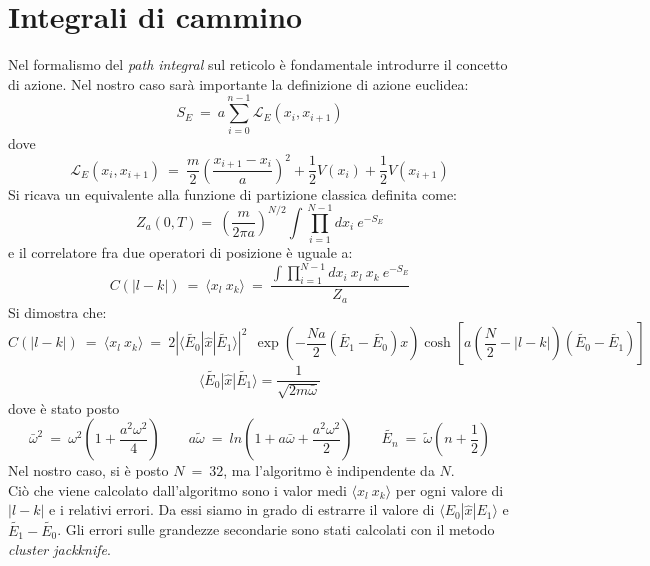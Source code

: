 \section{Integrali di cammino}
Nel formalismo del \emph{path integral} sul reticolo è fondamentale introdurre il concetto di azione.
Nel nostro caso sarà importante la definizione di azione euclidea:
$$
 S_E  \ = \ a \sum_{i=0}^{n-1} \mathcal{L}_E(x_i,x_{i+1})
$$
dove
$$
\mathcal{L}_E(x_i,x_{i+1}) \ = \ \frac{m}{2} \left( \frac{x_{i+1} -x_{i}}{a} \right)^2 + \frac{1}{2}V(x_i)  +\frac{1}{2}V(x_{i+1})
$$
 Si ricava un equivalente alla funzione di partizione classica definita come: 
$$
 Z_a (0,T) =  \ \left( \frac{m}{2 \pi a}\right)^{N/2} \int \prod_{i=1}^{N-1} dx_i \ e^{-S_E}
$$
e il correlatore fra due operatori di posizione è uguale a:
$$
 C( | l -k|) \ = \ \langle x_l \ x_k \rangle  \ = \  \frac{ \int \prod_{i=1}^{N-1} dx_i \ x_l \ x_k \ e^{-S_E}}{Z_a}
$$
Si dimostra che:
$$
 C( | l -k|) \ = \  \langle x_l \ x_k \rangle \ = \ 2 | \langle \tilde{E_0} | \hat{x} | \tilde{E_1} \rangle  |^2 \ \ \exp{\left( - \frac{N a}{2} \left( \tilde{E_1}-\tilde{E_0} \right) x \right)} \cosh \left[ a \left( \frac{N}{2} - | l - k | \right) (\tilde{E_0} -\tilde{E_1}) \right]  
$$
$$ 
\langle \tilde{E_0} | \hat{x} | \tilde{E_1} \rangle  = \frac{1}{\sqrt{2  m \bar{\omega}}}
$$
dove è stato posto
$$
 \bar{\omega}^2  \ = \  \omega^2 \left(1 + \frac{a^2 \omega^2}{4} \right) \qquad a \tilde{\omega} \ = \ ln \left( 1 + a \bar{\omega} + \frac{a^2 \omega^2}{2} \right) \qquad \tilde{E_n} \ = \  \tilde{\omega}\left( n + \frac{1}{2} \right) 
$$
Nel nostro caso, si è posto $ N \ = \ 32 $, ma l'algoritmo è indipendente da $N$.\\
Ciò che viene calcolato dall'algoritmo sono i valor medi $\langle x_l \ x_k \rangle $ per ogni valore di $ | l - k| $ e i relativi errori.
Da essi siamo in grado di estrarre il valore di $ \langle E_0 | \hat{x} | E_1 \rangle $ e $ \tilde{E_1}-\tilde{E_0} $.
Gli errori sulle grandezze secondarie sono stati calcolati con il metodo \emph{cluster jackknife}.
